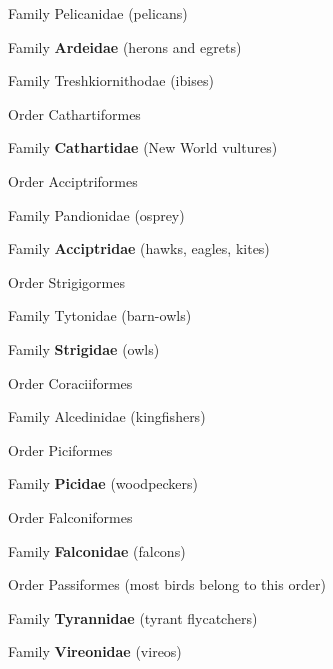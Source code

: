 \documentclass[10pt]{article}
\newlength\mylength
\newcommand*{\growparindent}{\addtolength{\parindent}{\mylength}}
\newcommand*{\reduceparindent}{\addtolength{\parindent}{-1\mylength}}
\begin{document}
\begin{multicols}{2}
\begin{spacing}{1.35}
      	Family Pelicanidae (pelicans)
      	
      	Family \textbf{Ardeidae} (herons and egrets)
      	
      	Family Treshkiornithodae (ibises)
      	
      \reduceparindent
      
      Order Cathartiformes
      
      	\growparindent
      
      	Family \textbf{Cathartidae} (New World vultures)
      	
      \reduceparindent
      
      Order Acciptriformes
      
      	\growparindent
      	
      	Family Pandionidae (osprey)
      	
      	Family \textbf{Acciptridae} (hawks, eagles, kites)
      	
      \reduceparindent
      
      Order Strigigormes
      
      	\growparindent
      	
      	Family Tytonidae (barn-owls)
      	
      	Family \textbf{Strigidae} (owls)
      	
      \reduceparindent
      
      Order Coraciiformes
      
      	\growparindent
      	
      	Family Alcedinidae (kingfishers)
      	
      \reduceparindent
      
      Order Piciformes
      
      	\growparindent
      	
      	Family \textbf{Picidae} (woodpeckers)
      	
	  \reduceparindent
	  
	  Order Falconiformes
	  
	  	\growparindent
	  	
	  	Family \textbf{Falconidae} (falcons)
	  	
	  \reduceparindent
	  
	  Order Passiformes (most birds belong to this order)
	  
	  \growparindent
	  
	  	Family \textbf{Tyrannidae} (tyrant flycatchers)
	  	
	  	Family \textbf{Vireonidae} (vireos)
	  	

\end{spacing}
\end{multicols}
\end{document}
